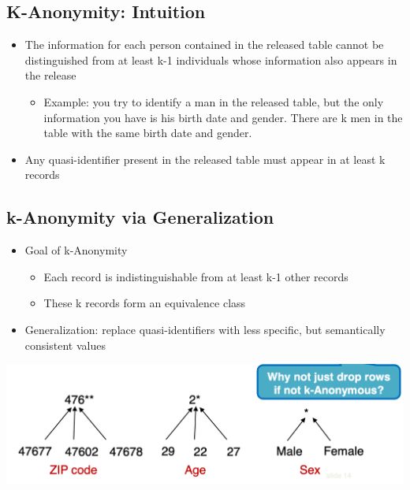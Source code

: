 \documentclass[11pt]{article}
\theoremstyle{definition}
\begin{document}
\subsection{K-Anonymity: Intuition}
\begin{itemize}
    \item The information for each person contained in the released table cannot be distinguished from at least k-1 individuals whose information also appears in the release
    \begin{itemize}
        \item Example: you try to identify a man in the released table, but the only information you have is his birth date and gender. There are k men in the table with the same birth date and gender.
    \end{itemize}
    \item Any quasi-identifier present in the released table must appear in at least k records
\end{itemize}

\subsection{k-Anonymity via Generalization}
\begin{itemize}
    \item Goal of k-Anonymity
    \begin{itemize}
        \item Each record is indistinguishable from at least k-1 other records
        \item These k records form an equivalence class
    \end{itemize}
    \item Generalization: replace quasi-identifiers with less specific, but semantically consistent values
\end{itemize}
\includegraphics[width=\textwidth/2]{17.png}
\end{document}
